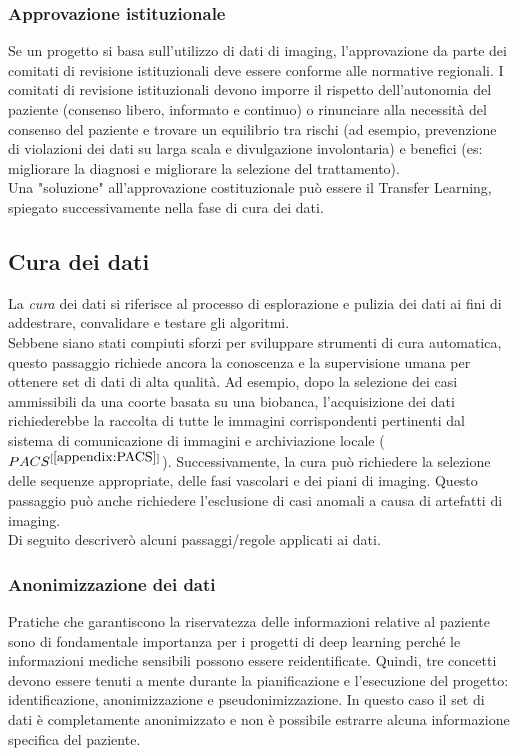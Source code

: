 \documentclass[12pt,a4paper]{report}
\begin{document}
\subsubsection{Approvazione istituzionale}
Se un progetto si basa sull’utilizzo di dati di imaging, l'approvazione da parte dei comitati di revisione istituzionali deve essere conforme alle normative regionali. I comitati di revisione istituzionali devono imporre il rispetto dell'autonomia del paziente (consenso libero, informato e continuo) o rinunciare alla necessità del consenso del paziente e trovare un equilibrio tra rischi (ad esempio, prevenzione di violazioni dei dati su larga scala e divulgazione involontaria) e benefici (es: migliorare la diagnosi e migliorare la selezione del trattamento).\\
Una "soluzione" all'approvazione costituzionale può essere il Transfer Learning, spiegato successivamente nella fase di cura dei dati.

\subsection{Cura dei dati}
La \emph{cura} dei dati si riferisce al processo di esplorazione e pulizia dei dati ai fini di addestrare, convalidare e testare gli algoritmi. \\
Sebbene siano stati compiuti sforzi per sviluppare strumenti di cura automatica, questo passaggio richiede ancora la conoscenza e la supervisione umana per ottenere set di dati di alta qualità.
Ad esempio, dopo la selezione dei casi ammissibili da una coorte basata su una biobanca, l'acquisizione dei dati richiederebbe la raccolta di tutte le immagini corrispondenti pertinenti dal sistema di comunicazione di immagini e archiviazione locale ($PACS^{[\ref{appendix:PACS}]}$). Successivamente, la cura può richiedere la selezione delle sequenze appropriate, delle fasi vascolari e dei piani di imaging. Questo passaggio può anche richiedere l'esclusione di casi anomali a causa di artefatti di imaging.\\
Di seguito descriverò alcuni passaggi/regole applicati ai dati.

\subsubsection{Anonimizzazione dei dati}
Pratiche che garantiscono la riservatezza delle informazioni relative al paziente sono di fondamentale importanza per i progetti di deep learning perché le informazioni mediche sensibili possono essere reidentificate. Quindi, tre concetti devono essere tenuti a mente durante la pianificazione e l'esecuzione del progetto: identificazione, anonimizzazione e pseudonimizzazione.
In questo caso il set di dati è completamente anonimizzato e non è possibile estrarre alcuna informazione specifica del paziente. 
\end{document}
